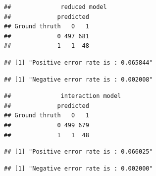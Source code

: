 \documentclass[
]{article}
\newenvironment{Shaded}{\begin{snugshade}}{\end{snugshade}}
\newcommand{\AttributeTok}[1]{\textcolor[rgb]{0.77,0.63,0.00}{#1}}
\newcommand{\CommentTok}[1]{\textcolor[rgb]{0.56,0.35,0.01}{\textit{#1}}}
\newcommand{\DecValTok}[1]{\textcolor[rgb]{0.00,0.00,0.81}{#1}}
\newcommand{\FunctionTok}[1]{\textcolor[rgb]{0.00,0.00,0.00}{#1}}
\newcommand{\NormalTok}[1]{#1}
\newcommand{\OtherTok}[1]{\textcolor[rgb]{0.56,0.35,0.01}{#1}}
\newcommand{\SpecialCharTok}[1]{\textcolor[rgb]{0.00,0.00,0.00}{#1}}
\newcommand{\StringTok}[1]{\textcolor[rgb]{0.31,0.60,0.02}{#1}}
\begin{document}
\begin{verbatim}
##              reduced model 
##             predicted
## Ground thruth   0   1
##             0 497 681
##             1   1  48
\end{verbatim}

\begin{verbatim}
## [1] "Positive error rate is : 0.065844"
\end{verbatim}

\begin{verbatim}
## [1] "Negative error rate is : 0.002008"
\end{verbatim}

\begin{Shaded}
\end{Shaded}

\begin{verbatim}
##              interaction model 
##             predicted
## Ground thruth   0   1
##             0 499 679
##             1   1  48
\end{verbatim}

\begin{verbatim}
## [1] "Positive error rate is : 0.066025"
\end{verbatim}

\begin{verbatim}
## [1] "Negative error rate is : 0.002000"
\end{verbatim}
\end{document}
